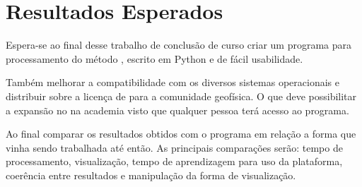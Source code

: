 \chapter{Resultados Esperados}
    \label{cap-resultados}
    Espera-se ao final desse trabalho de conclusão de curso criar um programa para processamento do método \MT, escrito em Python e de fácil usabilidade.
    
    Também melhorar a compatibilidade com os diversos sistemas operacionais e distribuir sobre a licença de  para a comunidade geofísica. O que deve possibilitar a expansão no \MT na academia visto que qualquer pessoa terá acesso ao programa.
    
    Ao final comparar os resultados obtidos com o programa em relação a forma que vinha sendo trabalhada até então. As principais comparações serão: tempo de processamento, visualização, tempo de aprendizagem para uso da plataforma, coerência entre resultados e manipulação da forma de visualização. 
